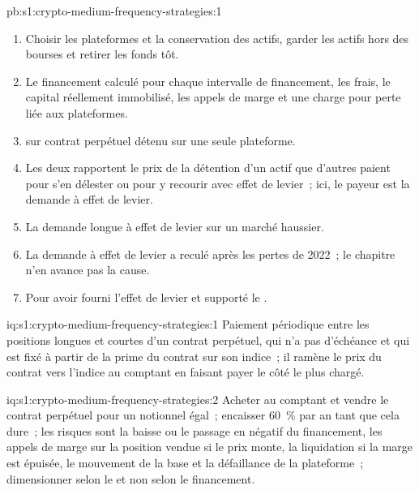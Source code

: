 \begin{solution}{pb:s1:crypto-medium-frequency-strategies:1}
\begin{enumerate}
sur quatre plateformes, il perd 20.2~\% du capital lorsqu'une plateforme fait défaut, avec une perte espérée liée aux plateformes de 4.1~\% par an.
\item Choisir les plateformes et la conservation des actifs, garder les actifs hors des bourses et retirer les fonds tôt.
\item Le financement calculé pour chaque intervalle de financement, les frais, le capital réellement immobilisé, les appels de marge et une charge pour perte liée aux plateformes.
\item {} sur contrat perpétuel détenu sur une seule plateforme.
\item Les deux rapportent le prix de la détention d'un actif que d'autres paient pour s'en délester ou pour y recourir avec effet de levier~; ici, le payeur est la demande à effet de levier.
\item La demande longue à effet de levier sur un marché haussier.
\item La demande à effet de levier a reculé après les pertes de 2022~; le chapitre n'en avance pas la cause.
\item Pour avoir fourni l'effet de levier et supporté le .
\end{enumerate}
\end{solution}

\begin{solution}{iq:s1:crypto-medium-frequency-strategies:1}
Paiement périodique entre les positions longues et courtes d'un contrat perpétuel, qui n'a pas d'échéance et qui est fixé à partir de la prime du contrat sur son indice~; il ramène le
prix du contrat vers l'indice au comptant en faisant payer le côté le plus chargé.
\end{solution}

\begin{solution}{iq:s1:crypto-medium-frequency-strategies:2}
Acheter au comptant et vendre le contrat perpétuel pour un notionnel égal~; encaisser 60~\% par an tant que cela dure~; les risques sont la baisse ou le passage en négatif du financement, les appels de marge sur la
position vendue si le prix monte, la liquidation si la marge est épuisée, le mouvement de la base et la défaillance de la plateforme~; dimensionner selon le  et non selon le financement.
\end{solution}

